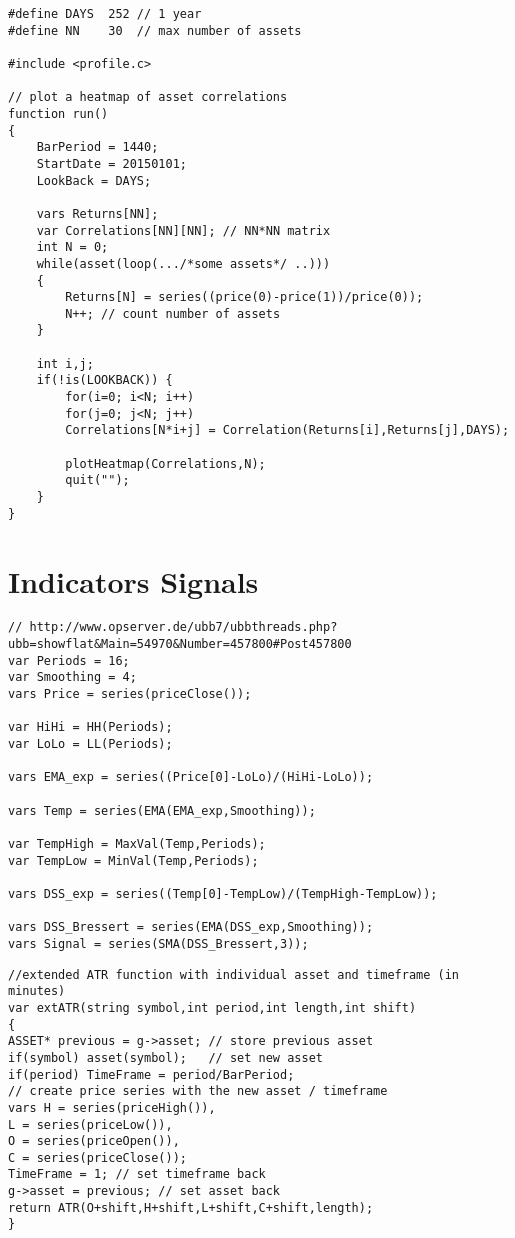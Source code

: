 \begin{lstlisting}[caption=Correlation  / heatmap]
#define DAYS  252 // 1 year
#define NN    30  // max number of assets

#include <profile.c>

// plot a heatmap of asset correlations
function run()
{
	BarPeriod = 1440;
	StartDate = 20150101;
	LookBack = DAYS;
	
	vars Returns[NN];
	var Correlations[NN][NN]; // NN*NN matrix
	int N = 0;
	while(asset(loop(.../*some assets*/ ..))) 
	{
		Returns[N] = series((price(0)-price(1))/price(0));
		N++; // count number of assets
	}
	
	int i,j;
	if(!is(LOOKBACK)) {
		for(i=0; i<N; i++)
		for(j=0; j<N; j++)
		Correlations[N*i+j] = Correlation(Returns[i],Returns[j],DAYS);
		
		plotHeatmap(Correlations,N);
		quit("");
	}
}
\end{lstlisting}


\section{Indicators   Signals}

\begin{lstlisting}[caption=DSS bessert]
// http://www.opserver.de/ubb7/ubbthreads.php?ubb=showflat&Main=54970&Number=457800#Post457800
var Periods = 16;
var Smoothing = 4;
vars Price = series(priceClose());

var HiHi = HH(Periods);
var LoLo = LL(Periods);

vars EMA_exp = series((Price[0]-LoLo)/(HiHi-LoLo));

vars Temp = series(EMA(EMA_exp,Smoothing));

var TempHigh = MaxVal(Temp,Periods);
var TempLow = MinVal(Temp,Periods);

vars DSS_exp = series((Temp[0]-TempLow)/(TempHigh-TempLow));

vars DSS_Bressert = series(EMA(DSS_exp,Smoothing));
vars Signal = series(SMA(DSS_Bressert,3));
\end{lstlisting}

\begin{lstlisting}[caption=Generate an indicator with a different asset  time frame  and shift]
//extended ATR function with individual asset and timeframe (in minutes)
var extATR(string symbol,int period,int length,int shift)
{
ASSET* previous = g->asset; // store previous asset
if(symbol) asset(symbol);   // set new asset
if(period) TimeFrame = period/BarPeriod;
// create price series with the new asset / timeframe
vars H = series(priceHigh()), 
L = series(priceLow()),
O = series(priceOpen()),
C = series(priceClose());
TimeFrame = 1; // set timeframe back
g->asset = previous; // set asset back
return ATR(O+shift,H+shift,L+shift,C+shift,length);
}
\end{lstlisting}

